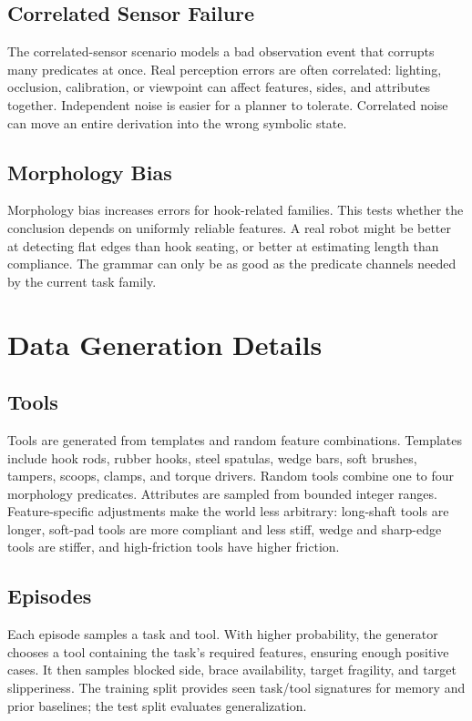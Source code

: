 \documentclass{article}
\begin{document}
\subsection{Correlated Sensor Failure}

The correlated-sensor scenario models a bad observation event that corrupts many predicates at once. Real perception errors are often correlated: lighting, occlusion, calibration, or viewpoint can affect features, sides, and attributes together. Independent noise is easier for a planner to tolerate. Correlated noise can move an entire derivation into the wrong symbolic state.

\subsection{Morphology Bias}

Morphology bias increases errors for hook-related families. This tests whether the conclusion depends on uniformly reliable features. A real robot might be better at detecting flat edges than hook seating, or better at estimating length than compliance. The grammar can only be as good as the predicate channels needed by the current task family.

\section{Data Generation Details}

\subsection{Tools}

Tools are generated from templates and random feature combinations. Templates include hook rods, rubber hooks, steel spatulas, wedge bars, soft brushes, tampers, scoops, clamps, and torque drivers. Random tools combine one to four morphology predicates. Attributes are sampled from bounded integer ranges. Feature-specific adjustments make the world less arbitrary: long-shaft tools are longer, soft-pad tools are more compliant and less stiff, wedge and sharp-edge tools are stiffer, and high-friction tools have higher friction.

\subsection{Episodes}

Each episode samples a task and tool. With higher probability, the generator chooses a tool containing the task's required features, ensuring enough positive cases. It then samples blocked side, brace availability, target fragility, and target slipperiness. The training split provides seen task/tool signatures for memory and prior baselines; the test split evaluates generalization.
\end{document}
